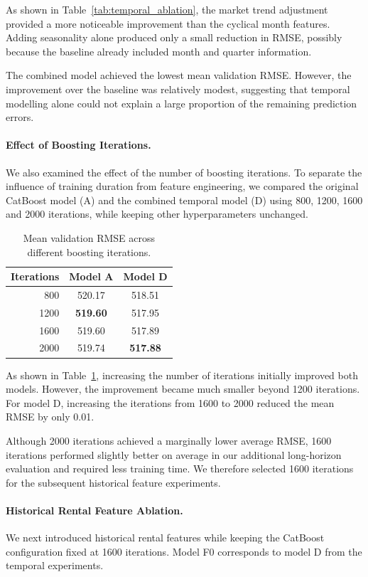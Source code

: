 \documentclass[11pt,a4paper]{article}
\begin{document}
As shown in Table~\ref{tab:temporal_ablation}, the market trend adjustment provided a more noticeable improvement than the cyclical month features. Adding seasonality alone produced only a small reduction in RMSE, possibly because the baseline already included month and quarter information.

The combined model achieved the lowest mean validation RMSE. However, the improvement over the baseline was relatively modest, suggesting that temporal modelling alone could not explain a large proportion of the remaining prediction errors.

\paragraph{Effect of Boosting Iterations.}
We also examined the effect of the number of boosting iterations. To separate the influence of training duration from feature engineering, we compared the original CatBoost model (A) and the combined temporal model (D) using 800, 1200, 1600 and 2000 iterations, while keeping other hyperparameters unchanged.

\begin{table}[t]
\centering
\caption{Mean validation RMSE across different boosting iterations.}
\label{tab:iteration_ablation}
\small
\begin{tabular}{rcc}
\hline
Iterations & Model A & Model D \\
\hline
800  & 520.17 & 518.51 \\
1200 & \textbf{519.60} & 517.95 \\
1600 & 519.60 & 517.89 \\
2000 & 519.74 & \textbf{517.88} \\
\hline
\end{tabular}
\end{table}

As shown in Table~\ref{tab:iteration_ablation}, increasing the number of iterations initially improved both models. However, the improvement became much smaller beyond 1200 iterations. For model D, increasing the iterations from 1600 to 2000 reduced the mean RMSE by only 0.01.

Although 2000 iterations achieved a marginally lower average RMSE, 1600 iterations performed slightly better on average in our additional long-horizon evaluation and required less training time. We therefore selected 1600 iterations for the subsequent historical feature experiments.

\paragraph{Historical Rental Feature Ablation.}
We next introduced historical rental features while keeping the CatBoost configuration fixed at 1600 iterations. Model F0 corresponds to model D from the temporal experiments.
\end{document}
